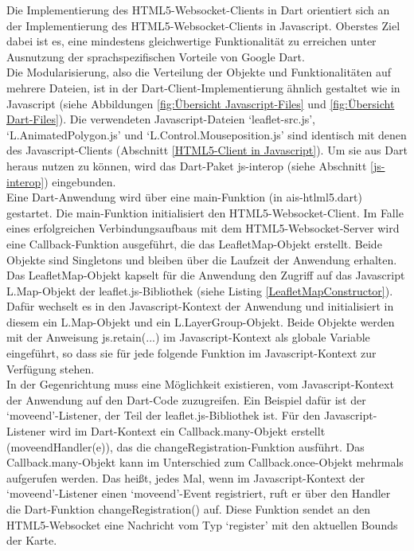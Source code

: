 Die Implementierung des HTML5-Websocket-Clients in Dart orientiert sich an der Implementierung des HTML5-Websocket-Clients in Javascript. Oberstes Ziel dabei ist es, eine mindestens gleichwertige Funktionalität zu erreichen unter Ausnutzung der sprachspezifischen Vorteile von Google Dart. \\

Die Modularisierung, also die Verteilung der Objekte und Funktionalitäten auf mehrere Dateien, ist in der Dart-Client-Implementierung ähnlich gestaltet wie in Javascript (siehe Abbildungen \ref{fig:Übersicht Javascript-Files} und \ref{fig:Übersicht Dart-Files}). Die verwendeten Javascript-Dateien ‘leaflet-src.js’, ‘L.AnimatedPolygon.js’ und ‘L.Control.Mouseposition.js’ sind identisch mit denen des Javascript-Clients (Abschnitt \ref{HTML5-Client in Javascript}). Um sie aus Dart heraus nutzen zu können, wird das Dart-Paket js-interop (siehe Abschnitt \ref{js-interop}) eingebunden.\\

Eine Dart-Anwendung wird über eine main-Funktion (in ais-htlml5.dart) gestartet. Die main-Funktion initialisiert den HTML5-Websocket-Client. Im Falle eines erfolgreichen Verbindungsaufbaus mit dem HTML5-Websocket-Server wird eine Callback-Funktion ausgeführt, die das LeafletMap-Objekt erstellt. Beide Objekte sind Singletons und bleiben über die Laufzeit der Anwendung erhalten.\\

Das LeafletMap-Objekt kapselt für die Anwendung den Zugriff auf das Javascript L.Map-Objekt der leaflet.js-Bibliothek (siehe Listing \ref{LeafletMapConstructor}). Dafür wechselt es in den Javascript-Kontext der Anwendung und initialisiert in diesem ein L.Map-Objekt und ein L.LayerGroup-Objekt. Beide Objekte werden mit der Anweisung js.retain(...) im Javascript-Kontext als globale Variable eingeführt, so dass sie für jede folgende Funktion im Javascript-Kontext zur Verfügung stehen.\\

In der Gegenrichtung muss eine Möglichkeit existieren, vom Javascript-Kontext der Anwendung auf den Dart-Code zuzugreifen. Ein Beispiel dafür ist der ‘moveend’-Listener, der Teil der leaflet.js-Bibliothek ist. Für den Javascript-Listener wird im Dart-Kontext ein Callback.many-Objekt erstellt (moveendHandler(e)), das die changeRegistration-Funktion ausführt. Das Callback.many-Objekt kann im Unterschied zum Callback.once-Objekt mehrmals aufgerufen werden. Das heißt, jedes Mal, wenn im Javascript-Kontext der  ‘moveend’-Listener einen  ‘moveend’-Event registriert, ruft er über den Handler die Dart-Funktion changeRegistration() auf. Diese Funktion sendet an den HTML5-Websocket eine Nachricht vom Typ ‘register’ mit den aktuellen Bounds der Karte.\\

